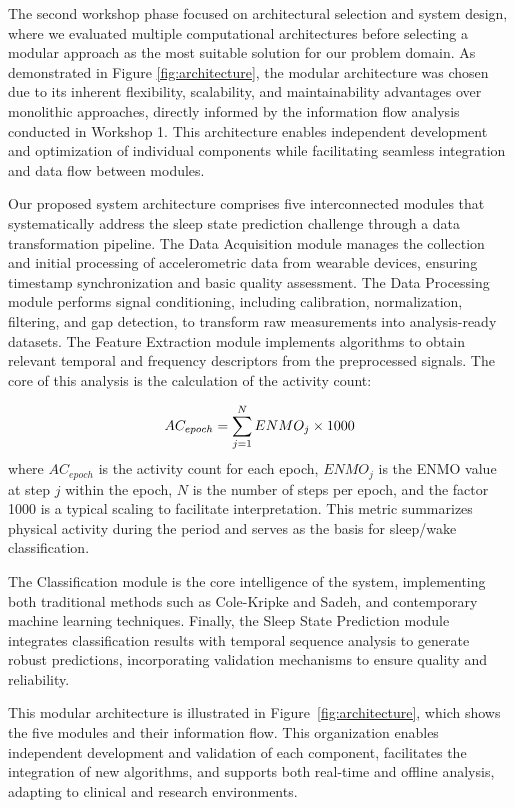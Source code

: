 \documentclass[conference]{IEEEtran}
\begin{document}
The second workshop phase focused on architectural selection and system design, where we evaluated multiple computational architectures before selecting a modular approach as the most suitable solution for our problem domain. As demonstrated in Figure \ref{fig:architecture}, the modular architecture was chosen due to its inherent flexibility, scalability, and maintainability advantages over monolithic approaches, directly informed by the information flow analysis conducted in Workshop 1. This architecture enables independent development and optimization of individual components while facilitating seamless integration and data flow between modules.

Our proposed system architecture comprises five interconnected modules that systematically address the sleep state prediction challenge through a data transformation pipeline. The Data Acquisition module manages the collection and initial processing of accelerometric data from wearable devices, ensuring timestamp synchronization and basic quality assessment. The Data Processing module performs signal conditioning, including calibration, normalization, filtering, and gap detection, to transform raw measurements into analysis-ready datasets. The Feature Extraction module implements algorithms to obtain relevant temporal and frequency descriptors from the preprocessed signals. The core of this analysis is the calculation of the activity count:

\begin{equation}
	\scriptsize
	AC_{epoch} = \sum_{j=1}^{N} ENMO_j \times 1000
\end{equation}
where $AC_{epoch}$ is the activity count for each epoch, $ENMO_j$ is the ENMO value at step $j$ within the epoch, $N$ is the number of steps per epoch, and the factor 1000 is a typical scaling to facilitate interpretation. This metric summarizes physical activity during the period and serves as the basis for sleep/wake classification.

The Classification module is the core intelligence of the system, implementing both traditional methods such as Cole-Kripke and Sadeh, and contemporary machine learning techniques. Finally, the Sleep State Prediction module integrates classification results with temporal sequence analysis to generate robust predictions, incorporating validation mechanisms to ensure quality and reliability.


This modular architecture is illustrated in Figure~\ref{fig:architecture}, which shows the five modules and their information flow. This organization enables independent development and validation of each component, facilitates the integration of new algorithms, and supports both real-time and offline analysis, adapting to clinical and research environments.
\end{document}
